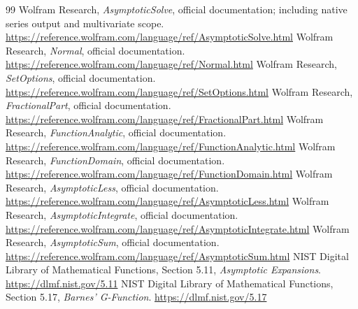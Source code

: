 \documentclass[11pt,letterpaper]{article}
\newcommand{\wlref}[1]{\url{https://reference.wolfram.com/language/ref/#1.html}}
\begin{document}
\begin{thebibliography}{99}
 Wolfram Research, \emph{AsymptoticSolve}, official documentation; including native series output and multivariate scope. \wlref{AsymptoticSolve}
 Wolfram Research, \emph{Normal}, official documentation. \wlref{Normal}
 Wolfram Research, \emph{SetOptions}, official documentation. \wlref{SetOptions}
 Wolfram Research, \emph{FractionalPart}, official documentation. \wlref{FractionalPart}
 Wolfram Research, \emph{FunctionAnalytic}, official documentation. \wlref{FunctionAnalytic}
 Wolfram Research, \emph{FunctionDomain}, official documentation. \wlref{FunctionDomain}
 Wolfram Research, \emph{AsymptoticLess}, official documentation. \wlref{AsymptoticLess}
 Wolfram Research, \emph{AsymptoticIntegrate}, official documentation. \wlref{AsymptoticIntegrate}
 Wolfram Research, \emph{AsymptoticSum}, official documentation. \wlref{AsymptoticSum}
 NIST Digital Library of Mathematical Functions, Section 5.11, \emph{Asymptotic Expansions}. \url{https://dlmf.nist.gov/5.11}
 NIST Digital Library of Mathematical Functions, Section 5.17, \emph{Barnes' G-Function}. \url{https://dlmf.nist.gov/5.17}
\end{thebibliography}
\end{document}
